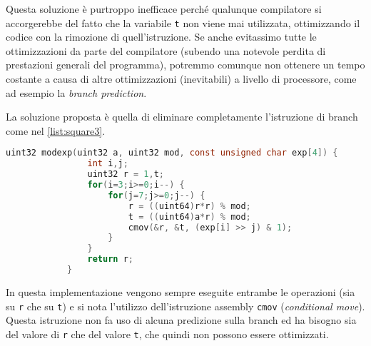 		Questa soluzione è purtroppo inefficace perché qualunque compilatore si accorgerebbe del fatto che la variabile \texttt{t} non viene mai utilizzata, ottimizzando il codice con la rimozione di quell'istruzione. Se anche evitassimo tutte le ottimizzazioni da parte del compilatore (subendo una notevole perdita di prestazioni generali del programma), potremmo comunque non ottenere un tempo costante a causa di altre ottimizzazioni (inevitabili) a livello di processore, come ad esempio la \emph{branch prediction}.
		
		La soluzione proposta è quella di eliminare completamente l'istruzione di branch come nel \cref{list:square3}.
		
		\begin{center}
			\begin{lstlisting}[language={C},caption={RSA, esponenziazione modulare v3},label={list:square3}]
			uint32 modexp(uint32 a, uint32 mod, const unsigned char exp[4]) {
				int i,j;
				uint32 r = 1,t;
				for(i=3;i>=0;i--) {
					for(j=7;j>=0;j--) {
						r = ((uint64)r*r) % mod;
						t = ((uint64)a*r) % mod;
						cmov(&r, &t, (exp[i] >> j) & 1);
					}
				}
				return r;
			}
			\end{lstlisting}
		\end{center}
	
		In questa implementazione vengono sempre eseguite entrambe le operazioni (sia su \texttt{r} che su \texttt{t}) e si nota l'utilizzo dell'istruzione assembly \texttt{cmov} (\emph{conditional move}). Questa istruzione non fa uso di alcuna predizione sulla branch ed ha bisogno sia del valore di \texttt{r} che del valore \texttt{t}, che quindi non possono essere ottimizzati.
		